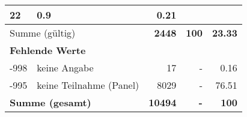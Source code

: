 \begin{longtable}{lXrrr}
       \num{22} &
       \num[round-mode=places,round-precision=2]{0.9} &
         \num[round-mode=places,round-precision=2]{0.21} \\
     \midrule
     \multicolumn{2}{l}{Summe (gültig)} &
       \textbf{\num{2448}} &
     \textbf{\num{100}} &
       \textbf{\num[round-mode=places,round-precision=2]{23.33}} \\
     \multicolumn{5}{l}{\textbf{Fehlende Werte}}\\
       -998 &
       keine Angabe &
         \num{17} &
        - &
         \num[round-mode=places,round-precision=2]{0.16} \\
       -995 &
       keine Teilnahme (Panel) &
         \num{8029} &
        - &
         \num[round-mode=places,round-precision=2]{76.51} \\
     \midrule
     \multicolumn{2}{l}{\textbf{Summe (gesamt)}} &
          \textbf{\num{10494}} &
        \textbf{-} &
        \textbf{\num{100}} \\
     \bottomrule
     \end{longtable}
     
